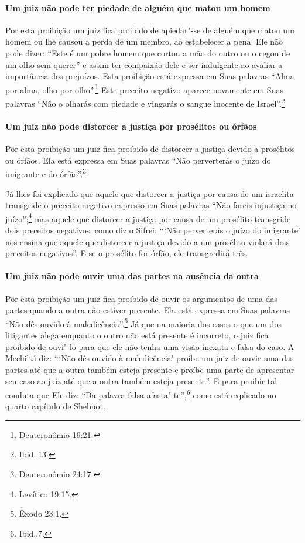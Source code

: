 \begin{multicols}{2}
\paragraph{Um juiz não pode ter piedade de alguém que matou um homem}

Por esta proibição um juiz fica proibido de apiedar"-se de alguém que
matou um homem ou lhe causou a perda de um membro, ao estabelecer a
pena. Ele não pode dizer: ``Este é um pobre homem que cortou a mão do
outro ou o cegou de um olho sem querer'' e assim ter compaixão dele e
ser indulgente ao avaliar a importância dos prejuízos. Esta proibição
está expressa em Suas palavras ``Alma por alma, olho por olho''.\footnote{Deuteronômio 19:21.} Este preceito negativo aparece novamente em Suas
palavras ``Não o olharás com piedade e vingarás o sangue inocente de
Israel''.\footnote{Ibid.,13.}

\paragraph{Um juiz não pode distorcer a justiça por prosélitos ou órfãos}

Por esta proibição um juiz fica proibido de distorcer a justiça devido
a prosélitos ou órfãos. Ela está expressa em Suas palavras ``Não
perverterás o juízo do imigrante e do órfão''.\footnote{Deuteronômio 24:17.}

Já lhes foi explicado que aquele que distorcer a justiça por causa de um
israelita transgride o preceito negativo expresso em Suas palavras ``Não
fareis injustiça no juízo'';\footnote{Levítico 19:15.} mas aquele que distorcer
a justiça por causa de um prosélito transgride dois preceitos negativos,
como diz o Sifrei\starr: ```Não perverterás o juízo do imigrante' nos ensina
que aquele que distorcer a justiça devido a um prosélito violará dois
preceitos negativos''. E se o prosélito for órfão, ele transgredirá
três.

\paragraph{Um juiz não pode ouvir uma das partes na ausência da outra}

Por esta proibição um juiz fica proibido de ouvir os argumentos de uma
das partes quando a outra não estiver presente. Ela está expressa em
Suas palavras ``Não dês ouvido à maledicência''.\footnote{Êxodo 23:1.} Já que na
maioria dos casos o que um dos litigantes alega enquanto o outro não
está presente é incorreto, o juiz fica proibido de ouvi"-lo para que ele
não tenha uma visão inexata e falsa do caso. A Mechiltá\starr{} diz: ```Não dês
ouvido à maledicência' proíbe um juiz de ouvir uma das partes até que a
outra também esteja presente e proíbe uma parte de apresentar seu caso
ao juiz até que a outra também esteja presente''. E para proibir tal
conduta que Ele diz: ``Da palavra falsa afasta"-te'',\footnote{Ibid.,7.} como está
explicado no quarto capítulo de Shebuot\starr.


\end{multicols}
